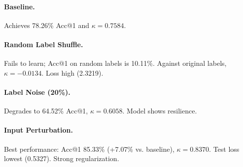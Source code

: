 \documentclass[10pt,twocolumn,letterpaper]{article}
\begin{document}
\begin{table*}[htbp!] %
    \centering
    \caption{Test set performance. "Loss", "Acc@1", "Acc@5" are on loader labels. "Cohen's $\kappa$" for "Shuffle" is vs. original labels. Best Acc@1, Acc@5, $\kappa$ bolded; lowest Loss (excl. Shuffle) bolded.}
    \label{tab:main_results}
\end{table*}

\paragraph{Baseline.} Achieves 78.26\% Acc@1 and $\kappa=0.7584$.
\paragraph{Random Label Shuffle.} Fails to learn; Acc@1 on random labels is 10.11\%. Against original labels, $\kappa=-0.0134$. Loss high (2.3219).
\paragraph{Label Noise (20\%).} Degrades to 64.52\% Acc@1, $\kappa=0.6058$. Model shows resilience.
\paragraph{Input Perturbation.} Best performance: Acc@1 85.33\% (+7.07\% vs. baseline), $\kappa=0.8370$. Test loss lowest (0.5327). Strong regularization.
\end{document}
